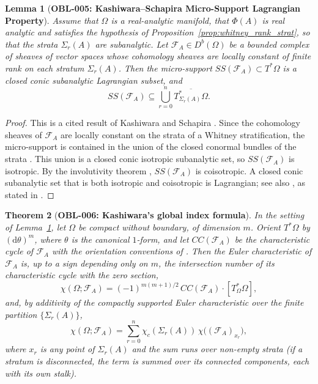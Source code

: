 \documentclass[11pt,a4paper,reqno]{amsart}
\newtheorem{theorem}{Theorem}[section]
\newtheorem{lemma}[theorem]{Lemma}
\theoremstyle{definition}
\theoremstyle{remark}
\numberwithin{equation}{section}
\newcommand{\dif}{\mathrm{d}}
\begin{document}
\begin{lemma}[\textbf{OBL-005: Kashiwara--Schapira Micro-Support Lagrangian Property}]
\label{lem:microsupport_lagrangian}
Assume that $\Omega$ is a real-analytic manifold, that $\Phi(A)$ is real analytic and satisfies the hypothesis of Proposition~\ref{prop:whitney_rank_strat}, so that the strata $\Sigma_r(A)$ are subanalytic. Let $\mathcal{F}_A \in D^b(\Omega)$ be a bounded complex of sheaves of vector spaces whose cohomology sheaves are locally constant of finite rank on each stratum $\Sigma_r(A)$. Then the micro-support $SS(\mathcal{F}_A) \subset T^*\Omega$ is a closed conic subanalytic Lagrangian subset, and
\begin{equation}
SS(\mathcal{F}_A) \subseteq \bigcup_{r=0}^n \overline{T^*_{\Sigma_r(A)} \Omega}.
\end{equation}
\end{lemma}

\begin{proof}
This is a cited result of Kashiwara and Schapira \cite{KashiwaraSchapira1990}. Since the cohomology sheaves of $\mathcal{F}_A$ are locally constant on the strata of a Whitney stratification, the micro-support is contained in the union of the closed conormal bundles of the strata \cite[Prop.~8.4.1]{KashiwaraSchapira1990}. This union is a closed conic isotropic subanalytic set, so $SS(\mathcal{F}_A)$ is isotropic. By the involutivity theorem \cite[Thm.~6.5.4]{KashiwaraSchapira1990}, $SS(\mathcal{F}_A)$ is coisotropic. A closed conic subanalytic set that is both isotropic and coisotropic is Lagrangian; see also \cite[Thm.~8.4.2]{KashiwaraSchapira1990}, as stated in \cite[Thm.~3.7]{Schapira2017}.
\end{proof}

\begin{theorem}[\textbf{OBL-006: Kashiwara's global index formula}]
\label{thm:kashiwara_index_cc}
In the setting of Lemma~\ref{lem:microsupport_lagrangian}, let $\Omega$ be compact without boundary, of dimension $m$. Orient $T^*\Omega$ by $(\dif\theta)^m$, where $\theta$ is the canonical $1$-form, and let $CC(\mathcal{F}_A)$ be the characteristic cycle of $\mathcal{F}_A$ with the orientation conventions of \cite[\S\S2--3]{Kashiwara1985}. Then the Euler characteristic of $\mathcal{F}_A$ is, up to a sign depending only on $m$, the intersection number of its characteristic cycle with the zero section,
\begin{equation}
\chi(\Omega; \mathcal{F}_A) = (-1)^{m(m+1)/2}\, CC(\mathcal{F}_A) \cdot [T^*_\Omega \Omega],
\end{equation}
and, by additivity of the compactly supported Euler characteristic over the finite partition $\{\Sigma_r(A)\}$,
\begin{equation}
\label{eq:chi_strata}
\chi(\Omega; \mathcal{F}_A) = \sum_{r=0}^n \chi_c(\Sigma_r(A))\, \chi\big((\mathcal{F}_A)_{x_r}\big),
\end{equation}
where $x_r$ is any point of $\Sigma_r(A)$ and the sum runs over non-empty strata (if a stratum is disconnected, the term is summed over its connected components, each with its own stalk).
\end{theorem}
\end{document}
